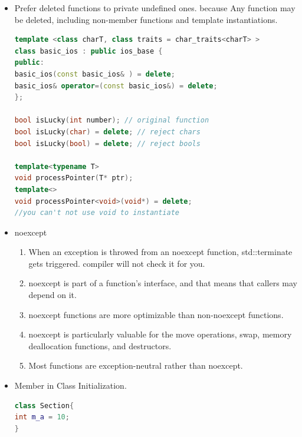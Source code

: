 \documentclass[a4paper,12pt,twoside]{book}
\begin{document}
\begin{itemize}
\item Prefer deleted functions to private undefined ones. because Any function may be deleted, including non-member functions and template instantiations.

\begin{lstlisting}[frame=single, language=c++]
template <class charT, class traits = char_traits<charT> >
class basic_ios : public ios_base {
public:
basic_ios(const basic_ios& ) = delete;
basic_ios& operator=(const basic_ios&) = delete;
};

bool isLucky(int number); // original function
bool isLucky(char) = delete; // reject chars
bool isLucky(bool) = delete; // reject bools

template<typename T>
void processPointer(T* ptr);
template<>
void processPointer<void>(void*) = delete;
//you can't not use void to instantiate
\end{lstlisting} 

\item noexcept

\begin{enumerate}

\item  When an exception is throwed from an noexcept function, std::terminate gets triggered. compiler will not check it for you.

\item noexcept is part of a function's interface, and that means that callers may
depend on it.

\item noexcept functions are more optimizable than non-noexcept functions.
\item noexcept is particularly valuable for the move operations, swap, memory
deallocation functions, and destructors.
\item Most functions are exception-neutral rather than noexcept.
\end{enumerate}


\item Member in Class Initialization.
\begin{lstlisting}[frame=single, language=c++]
class Section{
int m_a = 10;
}
\end{lstlisting}

\end{itemize}
\end{document}
